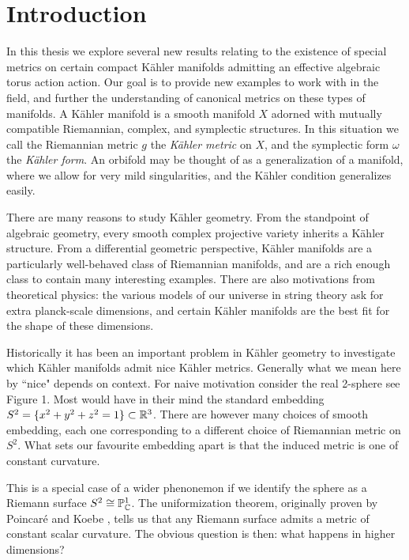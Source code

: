 \chapter{Introduction}


In this thesis we explore several new results relating to the existence of special metrics on certain compact K\"ahler manifolds admitting an effective algebraic torus action action. Our goal is to provide new examples to work with in the field, and further the understanding of canonical metrics on these types of manifolds. A K\"ahler manifold is a smooth manifold \(X\) adorned with mutually compatible Riemannian, complex, and symplectic structures. In this situation we call the Riemannian metric \(g\) the \textit{K\"ahler metric} on \(X\), and the symplectic form \(\omega\) the \textit{K\"ahler form}. An orbifold may be thought of as a generalization of a manifold, where we allow for very mild singularities, and the K\"ahler condition generalizes easily.

There are many reasons to study K\"ahler geometry. From the standpoint of algebraic geometry, every smooth complex projective variety inherits a K\"ahler structure. From a differential geometric perspective, K\"ahler manifolds are a particularly well-behaved class of Riemannian manifolds, and are a rich enough class to contain many interesting examples. There are also motivations from theoretical physics: the various models of our universe in string theory ask for extra planck-scale dimensions, and certain K\"ahler manifolds are the best fit for the shape of these dimensions.

Historically it has been an important problem in K\"ahler geometry to investigate which K\"ahler manifolds admit nice K\"ahler metrics. Generally what we mean here by ``nice" depends on context. For naive motivation consider the real 2-sphere see Figure 1. Most would have in their mind the standard embedding \(S^2 = \{ x^2+y^2+z^2 = 1 \} \subset \mathbb{R}^3\). There are however many choices of smooth embedding, each one corresponding to a different choice of Riemannian metric on \(S^2\). What sets our favourite embedding apart is that the induced metric is one of constant curvature.

This is a special case of a wider phenonemon if we identify the sphere as a Riemann surface \(S^2 \cong \mathbb{P}_{\mathbb{C}}^1\). The uniformization theorem, originally proven by Poincar\'e \cite{poincare1908uniformisation} and Koebe \cite{koebe1909uniformisierung, koebe1910uniformisierung}, tells us that any Riemann surface admits a metric of constant scalar curvature. The obvious question is then: what happens in higher dimensions?


